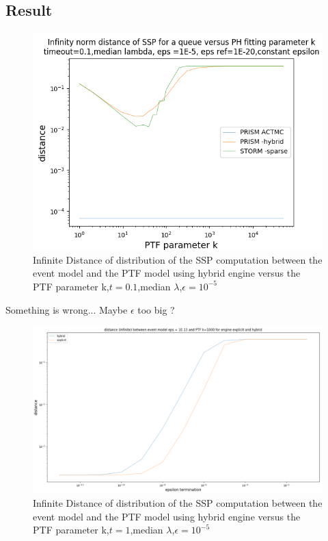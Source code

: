 \documentclass[paper=a4, fontsize=11pt]{scrartcl}
\numberwithin{equation}{section}		%
\numberwithin{figure}{section}			%
\numberwithin{table}{section}				%
\begin{document}
\clearpage
\subsection{Result}

\begin{figure}
	\centering
	\includegraphics[width=15cm]{picture/New_model/1E-5/distance_constant_1E-5.png}
	\caption{Infinite Distance of distribution of the SSP computation between the event model and the PTF model using hybrid engine versus the PTF parameter k,$t=0.1$,median $\lambda$,$\epsilon=10^{-5}$}
	\label{fig:dist_const_1E-5}
\end{figure}

Something is wrong... Maybe $\epsilon$ too big ?

\begin{figure}
	\centering
	\includegraphics[width=17cm]{picture/New_model/distance_epsilon.png}
	\caption{Infinite Distance of distribution of the SSP computation between the event model and the PTF model using hybrid engine versus the PTF parameter k,$t=1$,median $\lambda$,$\epsilon=10^{-5}$}
	\label{fig:dist_epsilon_1E-13}
\end{figure}	
		
\end{document}
